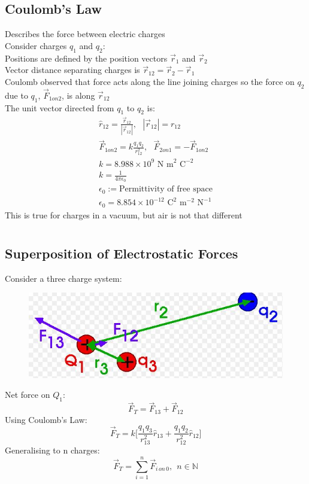 \documentclass[a4paper, 11pt, fleqn, normalem]{report}
\begin{document}
\section{Coulomb's Law}
Describes the force between electric charges \\
Consider charges $q_{1}$ and $q_{2}$: \\
Positions are defined by the position vectors $\vec{r}_{1}$ and $\vec{r}_{2}$ \\
Vector distance separating charges is $\vec{r}_{12} = \vec{r}_{2} - \vec{r}_{1}$ \\
Coulomb observed that force acts along the line joining charges so the force on $q_{2}$ due to $q_{1}$, $\vec{F}_{1on2}$, is along $\vec{r}_{12}$ \\
The unit vector directed from $q_{1}$ to $q_{2}$ is:
\begin{gather*}
    \hat{r}_{12} = \frac{\vec{r}_{12}}{|\vec{r}_{12}|},~~~|\vec{r}_{12}| = r_{12} \\
    \vec{F}_{1on2} = k\frac{q_{1}q_{2}}{r_{12}^{2}},~~~\vec{F}_{2on1} = -\vec{F}_{1on2} \\
    k = 8.988\times10^9\text{ N m}^{2}\text{ C}^{-2} \\
    k = \frac{1}{4\pi\epsilon_{0}} \\
    \epsilon_{0} := \text{Permittivity of free space} \\
    \epsilon_{0} = 8.854\times10^{-12}\text{ C}^{2}\text{ m}^{-2}\text{ N}^{-1}
\end{gather*}
This is true for charges in a vacuum, but air is not that different

\chapter{}
\section{Superposition of Electrostatic Forces}
Consider a three charge system:
\begin{figure}[H]
    \includegraphics{3Force.jpg}
\end{figure}
Net force on $Q_{1}$:
\begin{equation*}
    \vec{F}_{T} = \vec{F}_{13} + \vec{F}_{12}
\end{equation*}
Using Coulomb's Law:
\begin{equation*}
    \vec{F}_{T} = k\Big[\frac{q_{1}q_{3}}{r_{13}^{2}}\hat{r}_{13} + \frac{q_{1}q_{2}}{r_{12}^{2}}\hat{r}_{12}\Big]
\end{equation*}
Generalising to n charges:
\begin{equation*}
    \vec{F}_{T} = \sum_{i = 1}^{n} \vec{F}_{i\,on\,0},~~n \in \mathbb{N}
\end{equation*}
\end{document}
